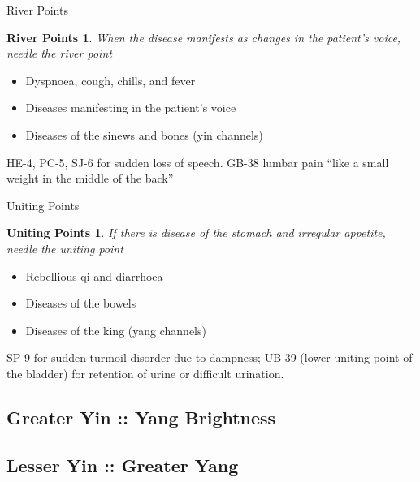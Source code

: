 \begin{frame}{River Points}
\newtheorem{river}{River Points}
\begin{river}
When the disease manifests as changes in the patient's voice, needle the river point
\end{river}

\begin{itemize}
\item Dyspnoea, cough, chills, and fever
\item Diseases manifesting in the patient's voice
\item Diseases of the sinews and bones (yin channels) 
\end{itemize}

\vspace{0.5em}

HE-4, PC-5, SJ-6 for sudden loss of speech. GB-38 lumbar pain ``like a small weight in the middle of the back'' 

\end{frame}

\begin{frame}{Uniting Points}
\newtheorem{unite}{Uniting Points}
\begin{unite}
If there is disease of the stomach and irregular appetite, needle the uniting point
\end{unite}

\begin{itemize}
\item Rebellious qi and diarrhoea
\item Diseases of the bowels
\item Diseases of the king (yang channels) 
\end{itemize}

\vspace{0.5em}

SP-9 for sudden turmoil disorder due to dampness; UB-39 (lower uniting point of the bladder) for retention of urine or difficult urination. 
\end{frame}

\subsection{Greater Yin :: Yang Brightness}

\subsection{Lesser Yin :: Greater Yang}


